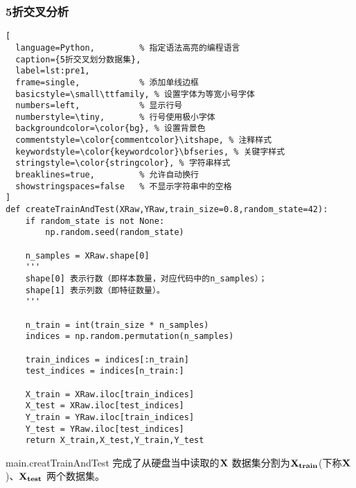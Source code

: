 \subsubsection{5折交叉分析}
\begin{lstlisting}[
  language=Python,         % 指定语法高亮的编程语言
  caption={5折交叉划分数据集},
  label=lst:pre1,
  frame=single,            % 添加单线边框
  basicstyle=\small\ttfamily, % 设置字体为等宽小号字体
  numbers=left,            % 显示行号
  numberstyle=\tiny,       % 行号使用极小字体
  backgroundcolor=\color{bg}, % 设置背景色
  commentstyle=\color{commentcolor}\itshape, % 注释样式
  keywordstyle=\color{keywordcolor}\bfseries, % 关键字样式
  stringstyle=\color{stringcolor}, % 字符串样式
  breaklines=true,         % 允许自动换行
  showstringspaces=false   % 不显示字符串中的空格
]
def createTrainAndTest(XRaw,YRaw,train_size=0.8,random_state=42):
	if random_state is not None:
		np.random.seed(random_state)
	
	n_samples = XRaw.shape[0]
	'''
	shape[0] 表示行数（即样本数量，对应代码中的n_samples）；
	shape[1] 表示列数（即特征数量）。
	'''
	
	n_train = int(train_size * n_samples)
	indices = np.random.permutation(n_samples)
	
	train_indices = indices[:n_train]
	test_indices = indices[n_train:]
	
	X_train = XRaw.iloc[train_indices]
	X_test = XRaw.iloc[test_indices]
	Y_train = YRaw.iloc[train_indices]
	Y_test = YRaw.iloc[test_indices]
	return X_train,X_test,Y_train,Y_test
\end{lstlisting}
\par main.creatTrainAndTest 完成了从硬盘当中读取的$\bf X $ 数据集分割为$\bf{X_{train}} $(下称$\bf{X}$)、$\bf{X_{test}}$ 两个数据集。

